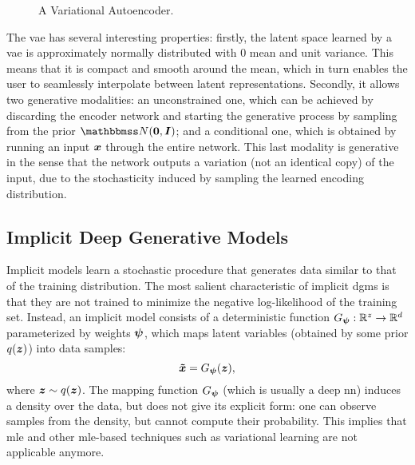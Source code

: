 \begin{figure*}[h!]
    \centering
    \resizebox{.75\textwidth}{!}{}
    \caption{A Variational Autoencoder.}
    \label{fig:vae}
\end{figure*}
The \gls{vae} has several interesting properties: firstly, the latent space learned by a \gls{vae} is approximately normally distributed with 0 mean and unit variance. This means that it is compact and smooth around the mean, which in turn enables the user to seamlessly interpolate between latent representations. Secondly, it allows two generative modalities: an unconstrained one, which can be achieved by discarding the encoder network and starting the generative process by sampling from the prior $\Normal{\Zeros}{\Identity}$; and a conditional one, which is obtained by running an input $\Vector{x}$ through the entire network. This last modality is generative in the sense that the network outputs a variation (not an identical copy) of the input, due to the stochasticity induced by sampling the learned encoding distribution.

\subsection{Implicit Deep Generative Models}
Implicit models \citep{mohamed2016implicitgan} learn a stochastic procedure that generates data similar to that of the training distribution. The most salient characteristic of implicit \glspl{dgm} is that they are not trained to minimize the negative log-likelihood of the training set. Instead, an implicit model consists of a deterministic  function $G_{\boldsymbol{\psi}}: \mathbb{R}^z \rightarrow \mathbb{R}^d$ parameterized by weights $\boldsymbol{\psi}$, which maps latent variables (obtained by some prior $q(\Vector{z})$) into data samples:
$$\Vector{\tilde{x}} = \Generator(\Vector{z}),$$
where $\Vector{z} \sim q(\Vector{z})$. The mapping function $G_{\boldsymbol{\psi}}$ (which is usually a deep \gls{nn}) induces a density over the data, but does not give its explicit form: one can observe samples from the density, but cannot compute their probability. This implies that \gls{mle} and other \gls{mle}-based techniques such as variational learning are not applicable anymore.

